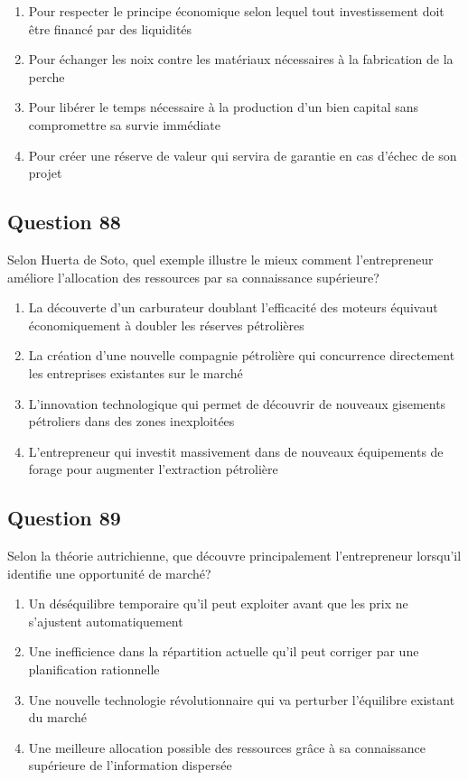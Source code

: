 \documentclass[12pt,a4paper]{article}
\begin{document}
\begin{enumerate}[label=\Alph*., leftmargin=*]
\item Pour respecter le principe économique selon lequel tout investissement doit être financé par des liquidités
\item Pour échanger les noix contre les matériaux nécessaires à la fabrication de la perche
\item Pour libérer le temps nécessaire à la production d'un bien capital sans compromettre sa survie immédiate
\item Pour créer une réserve de valeur qui servira de garantie en cas d'échec de son projet
\end{enumerate}

\bigskip


\subsection*{Question 88}
Selon Huerta de Soto, quel exemple illustre le mieux comment l'entrepreneur améliore l'allocation des ressources par sa connaissance supérieure?

\begin{enumerate}[label=\Alph*., leftmargin=*]
\item La découverte d'un carburateur doublant l'efficacité des moteurs équivaut économiquement à doubler les réserves pétrolières
\item La création d'une nouvelle compagnie pétrolière qui concurrence directement les entreprises existantes sur le marché
\item L'innovation technologique qui permet de découvrir de nouveaux gisements pétroliers dans des zones inexploitées
\item L'entrepreneur qui investit massivement dans de nouveaux équipements de forage pour augmenter l'extraction pétrolière
\end{enumerate}

\bigskip


\subsection*{Question 89}
Selon la théorie autrichienne, que découvre principalement l'entrepreneur lorsqu'il identifie une opportunité de marché?

\begin{enumerate}[label=\Alph*., leftmargin=*]
\item Un déséquilibre temporaire qu'il peut exploiter avant que les prix ne s'ajustent automatiquement
\item Une inefficience dans la répartition actuelle qu'il peut corriger par une planification rationnelle
\item Une nouvelle technologie révolutionnaire qui va perturber l'équilibre existant du marché
\item Une meilleure allocation possible des ressources grâce à sa connaissance supérieure de l'information dispersée
\end{enumerate}
\end{document}
